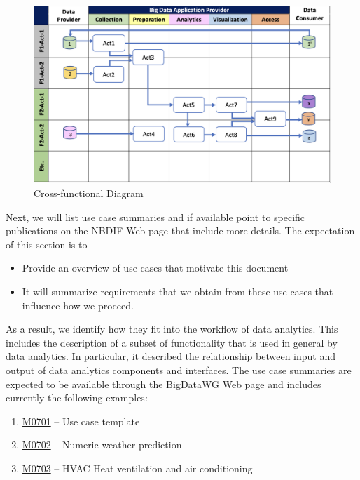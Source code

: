 \begin{figure}[htb]
    \centering
    \includegraphics[width=1.0\columnwidth]{images/cross-functional-diagram.png}
    \caption{Cross-functional Diagram}
    \label{fig:cross-functional-diagram}
\end{figure}


Next, we will list use case summaries and if available point to specific publications on the NBDIF Web page that include more details. The expectation of this section is to
 
\begin{itemize}
\item	Provide an overview of use cases that motivate this document
\item	It will summarize requirements that we obtain from these use cases that influence how we proceed.
\end{itemize}

As a result, we identify how they fit into the workflow of data analytics. This includes the description of a subset of functionality that is used in general by data analytics.  In particular, it described the relationship between input and output of data analytics components and interfaces.  The use case summaries are expected to be available through the BigDataWG Web page and includes currently the following examples:

\begin{enumerate}
\item	\href{https://bigdatawg.nist.gov/_uploadfiles/M0701_v1_2020102001.docx}{M0701} -- Use case template \cite{nist-usecase-template}
\item	\href{https://bigdatawg.nist.gov/_uploadfiles/M0702_v1_2020102002.pdf}{M0702} -- Numeric weather prediction \cite{nist-wrf}
\item	\href{https://bigdatawg.nist.gov/_uploadfiles/M0703_v1_2020102003.pdf}{M0703} -- HVAC Heat ventilation and air conditioning \cite{nist-hvac}
\end{enumerate}



